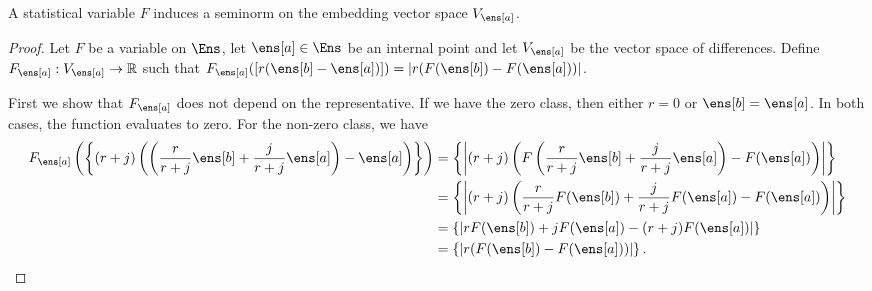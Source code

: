\begin{mathSection}
\begin{prop}
	A statistical variable $F$ induces a seminorm on the embedding vector space $V_{\ens[a]}$.
\end{prop}

\begin{proof}
	Let $F$ be a variable on $\Ens$, let $\ens[a] \in \Ens$ be an internal point and let $V_{\ens[a]}$ be the vector space of differences. Define $F_{\ens[a]} : V_{\ens[a]} \to \mathbb{R}$ such that $F_{\ens[a]}([r(\ens[b]-\ens[a])]) = |r (F(\ens[b]) - F(\ens[a]))|$.
	
	First we show that $F_{\ens[a]}$ does not depend on the representative. If we have the zero class, then either $r=0$ or $\ens[b] = \ens[a]$. In both cases, the function evaluates to zero. For the non-zero class, we have
	\begin{equation}
		\begin{aligned}
			F_{\ens[a]}\left(\left\{(r+j)\left(\left(\frac{r}{r+j}\ens[b] +\frac{j}{r+j} \ens[a]\right) -\ens[a]\right)\right\}\right) &= \left\{ \left|(r+j)\left(F\left(\frac{r}{r+j}\ens[b] +\frac{j}{r+j} \ens[a]\right) - F(\ens[a]) \right)\right| \right\} \\
			&= \left\{ \left|(r+j)\left(\frac{r}{r+j}F(\ens[b]) +\frac{j}{r+j} F(\ens[a]) - F(\ens[a]) \right)\right| \right\} \\
			&= \left\{ \left| r F(\ens[b]) + j F(\ens[a]) - (r+j) F(\ens[a]) \right| \right\} \\
			&= \left\{|r (F(\ens[b]) - F(\ens[a]))|\right\}.
		\end{aligned}
	\end{equation}
	

\end{proof}
\end{mathSection}
